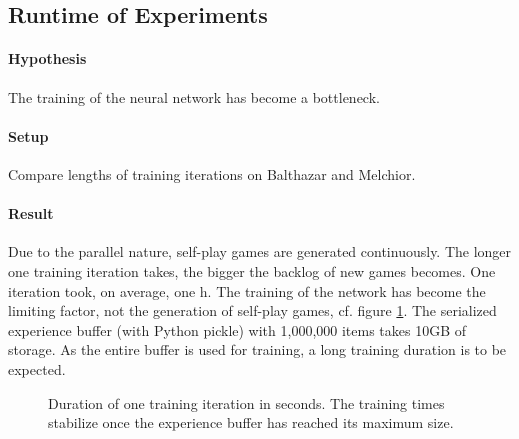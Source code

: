 \subsection{Runtime of Experiments}
\paragraph{Hypothesis} The training of the neural network has become a bottleneck.
\paragraph{Setup} Compare lengths of training iterations on Balthazar and Melchior.

\paragraph{Result} Due to the parallel nature, self-play games are generated continuously. The longer one training iteration takes, the bigger the backlog of new games becomes. One iteration took, on average, one h. The training of the network has become the limiting factor, not the generation of self-play games, cf. figure \ref{iteration_duration}. The serialized experience buffer (with Python pickle) with 1,000,000 items takes 10GB of storage. As the entire buffer is used for training, a long training duration is to be expected.

\begin{figure}[!h]
    \centering
    \hfill
    \caption{Duration of one training iteration in seconds. The training times stabilize once the experience buffer has reached its maximum size.}
    \label{iteration_duration}
\end{figure}